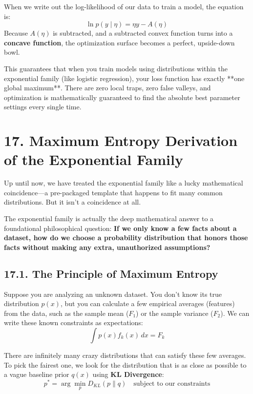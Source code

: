 \documentclass{article}
\begin{document}
When we write out the log-likelihood of our data to train a model, the equation is:
\begin{equation*}
\ln p(y \mid \eta) = \eta y - A(\eta)
\end{equation*}
Because $A(\eta)$ is subtracted, and a subtracted convex function turns into a \textbf{concave function}, the optimization surface becomes a perfect, upside-down bowl. 

This guarantees that when you train models using distributions within the exponential family (like logistic regression), your loss function has exactly **one global maximum**. There are zero local traps, zero false valleys, and optimization is mathematically guaranteed to find the absolute best parameter settings every single time.

\section*{17. Maximum Entropy Derivation of the Exponential Family}

Up until now, we have treated the exponential family like a lucky mathematical coincidence—a pre-packaged template that happens to fit many common distributions. But it isn't a coincidence at all. 

The exponential family is actually the deep mathematical answer to a foundational philosophical question: \textbf{If we only know a few facts about a dataset, how do we choose a probability distribution that honors those facts without making any extra, unauthorized assumptions?}

\subsection*{17.1. The Principle of Maximum Entropy}
Suppose you are analyzing an unknown dataset. You don't know its true distribution $p(x)$, but you can calculate a few empirical averages (features) from the data, such as the sample mean ($F_1$) or the sample variance ($F_2$). We can write these known constraints as expectations:
\begin{equation}
\int p(x) f_k(x) \, dx = F_k \tag{88}
\end{equation}

There are infinitely many crazy distributions that can satisfy these few averages. To pick the fairest one, we look for the distribution that is as close as possible to a vague baseline prior $q(x)$ using \textbf{KL Divergence}:
\begin{equation}
p^* = \arg\min_p D_{KL}(p \parallel q) \quad \text{subject to our constraints} \tag{89}
\end{equation}
\end{document}

